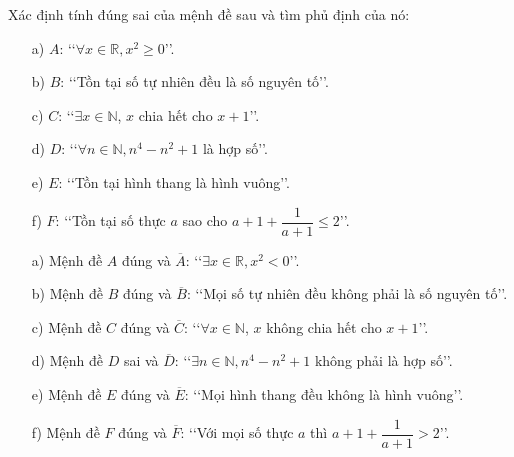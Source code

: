 \begin{bt}%
	Xác định tính đúng sai của mệnh đề sau và tìm phủ định của nó:
	\begin{enumerate}
		\item[a)] $A$: \lq\lq$\forall x\in\mathbb{R},x^2\ge0$\rq\rq.
		\item[b)] $B$: \lq\lq Tồn tại số tự nhiên đều là số nguyên tố\rq\rq.
		\item[c)] $C$: \lq\lq$\exists x\in\mathbb{N}$, $x$ chia hết cho $ x+1 $\rq\rq.
		\item[d)] $D$: \lq\lq$ \forall n\in\mathbb{N},n^4-n^2+1$ là hợp số\rq\rq.
		\item[e)] $E$: \lq\lq Tồn tại hình thang là hình vuông\rq\rq.
		\item[f)] $F$: \lq\lq Tồn tại số thực $a$ sao cho $a+1+\dfrac{1}{a+1}\le2$\rq\rq.
	\end{enumerate}
	\loigiai
	{
		\begin{enumerate}
			\item[a)] Mệnh đề $A$ đúng và $ \overline{A}$: \lq\lq$\exists x\in\mathbb{R},x^2<0$\rq\rq.
			\item[b)] Mệnh đề $B $ đúng và $\overline{B}$: \lq\lq Mọi số tự nhiên đều không phải là số nguyên tố\rq\rq.
			\item[c)] Mệnh đề $C$ đúng và $\overline{C}$: \lq\lq $\forall x\in\mathbb{N}$, $x$ không chia hết cho $ x+1 $\rq\rq.
			\item[d)] Mệnh đề $D$ sai và $\overline{D}$: \lq\lq $\exists n\in\mathbb{N},n^4-n^2+1 $ không phải là hợp số\rq\rq.
			\item[e)] Mệnh đề $E$ đúng và $\overline{E}$: \lq\lq Mọi hình thang đều không là hình vuông\rq\rq.
			\item[f)] Mệnh đề $F$ đúng và $\overline{F}$: \lq\lq Với mọi số thực $a$ thì $a+1+\dfrac{1}{a+1}>2$\rq\rq.
		\end{enumerate}	
	}
\end{bt}
